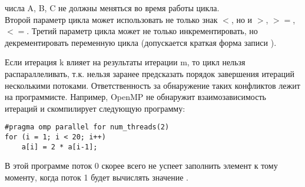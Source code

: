  числа A, B, C не должны меняться во время работы цикла. \\
Второй параметр цикла может использовать не только знак $<$, но и $>$, $>=$, $<=$. Третий параметр цикла может не только инкрементировать, но декрементировать переменную цикла (допускается краткая форма записи ).

Если итерация k влияет на результаты итерации m, то цикл нельзя распараллеливать, т.к. нельзя заранее предсказать порядок завершения итераций несколькими потоками.  Ответственность за обнаружение таких конфликтов лежит на программисте. Например, OpenMP не обнаружит взаимозависимость итераций и скомпилирует следующую программу:

\begin{verbatim}
#pragma omp parallel for num_threads(2)
for (i = 1; i < 20; i++)
    a[i] = 2 * a[i-1];
\end{verbatim}

В этой программе поток 0 скорее всего не успеет заполнить элемент  к тому моменту, когда поток 1 будет вычислять значение .
